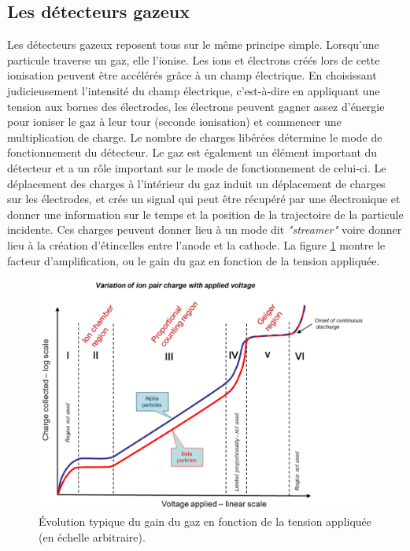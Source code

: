 \subsection{Les détecteurs gazeux}
Les détecteurs gazeux reposent tous sur le même principe simple. Lorsqu'une particule traverse un gaz, elle l'ionise. Les ions et électrons créés lors de cette ionisation peuvent être accélérés grâce à un champ électrique. En choisissant judicieusement l'intensité du champ électrique, c'est-à-dire en appliquant une tension aux bornes des électrodes, les électrons peuvent gagner assez d'énergie pour ioniser le gaz à leur tour (seconde ionisation) et commencer une multiplication de charge. Le nombre de charges libérées détermine le mode de fonctionnement du détecteur. Le gaz est également un élément important du détecteur et a un rôle important sur le mode de fonctionnement de celui-ci. Le déplacement des charges à l'intérieur du gaz induit un déplacement de charges sur les électrodes, et crée un signal qui peut être récupéré par une électronique et donner une information sur le temps et la position de la trajectoire de la particule incidente. Ces charges peuvent donner lieu à un mode dit \textit{"streamer"} voire donner lieu à la création d'étincelles entre l'anode et la cathode. La figure \ref{mult} montre le facteur d'amplification, ou le gain du gaz en fonction de la tension appliquée. 

\begin{figure}[ht!]
	\centering
	\includegraphics[width=0.98\textwidth]{RPC/gasgain.png}
	\captionsetup{type=figure}\caption{Évolution typique du gain du gaz en fonction de la tension appliquée (en échelle arbitraire).}
	\label{mult}
\end{figure}

